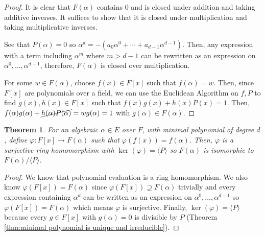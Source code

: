 \documentclass[
    parskip=half,
    toc=flat,
    toc=sectionentrydotfill,
]{scrartcl}  %
\theoremstyle{definition}
\theoremstyle{plain}
\newtheorem{theorem}{Theorem}[definition]
\theoremstyle{remark}
\begin{document}
\begin{proof}
    It is clear that $F(\alpha)$ contains $0$ and is closed under addition and taking additive
    inverses.
    It suffices to show that it is closed under multiplication and taking multiplicative inverses.

    See that $P(\alpha)=0$ so $\alpha^d=-(a_0\alpha^0+\cdots+a_{d-1}\alpha^{d-1})$.
    Then, any expression with a term including $\alpha^m$ where $m>d-1$ can be rewritten as an
    expression on $\alpha^0,\dots,\alpha^{d-1}$, therefore, $F(\alpha)$ is closed over
    multiplication.

    For some $w\in F(\alpha)$, choose $f(x)\in F[x]$ such that $f(\alpha)=w$.
    Then, since $F[x]$ are polynomials over a field, we can use the Euclidean Algorithm on $f,P$ to
    find $g(x),h(x)\in F[x]$ such that $f(x)g(x)+h(x)P(x)=1$.
    Then, $f(\alpha)g(\alpha)+\cancel{h(\alpha)P(\alpha)}=wg(\alpha)=1$ with
    $g(\alpha)\in F(\alpha)$.
\end{proof}

\begin{theorem}
    For an algebraic $\alpha\in E$ over $F$, with minimal polynomial of degree $d$, define
    $\varphi:F[x]\to F(\alpha)$ such that $\varphi(f(x))=f(\alpha)$.
    Then, $\varphi$ is a surjective ring homomorphism with $\ker(\varphi)=\langle P\rangle$ so
    $F(\alpha)$ is isomorphic to $F(\alpha)/\langle P\rangle$.
\end{theorem}

\begin{proof}
    We know that polynomial evaluation is a ring homomorphism.
    We also know $\varphi(F[x])=F(\alpha)$ since $\varphi(F[x])\supseteq F(\alpha)$ trivially and
    every expression containing $\alpha^d$ can be written as an expression on
    $\alpha^0,\dots,\alpha^{d-1}$ so $\varphi(F[x])=F(\alpha)$ which means $\varphi$ is surjective.
    Finally, $\ker(\varphi)=\langle P\rangle$ because every $g\in F[x]$ with $g(\alpha)=0$ is
    divisible by $P$ (Theorem \ref{thm:minimal polynomial is unique and irreducible}).
\end{proof}
\end{document}
